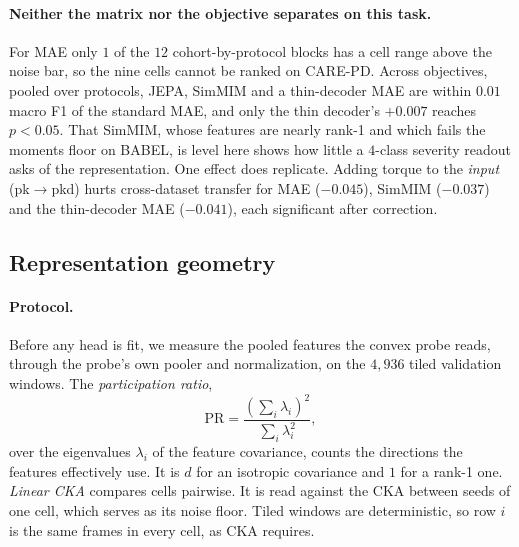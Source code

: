 \paragraph{Neither the matrix nor the objective separates on this task.} For MAE only $1$
of the $12$ cohort-by-protocol blocks has a cell range above the noise bar, so the nine
cells cannot be ranked on CARE-PD. Across objectives, pooled over protocols, JEPA, SimMIM
and a thin-decoder MAE are within $0.01$ macro F1 of the standard MAE, and only the thin
decoder's $+0.007$ reaches $p<0.05$. That SimMIM, whose features are nearly rank-1 and which
fails the moments floor on BABEL, is level here shows how little a $4$-class severity
readout asks of the representation. One effect does replicate. Adding torque to the
\emph{input} (\textsf{pk}$\to$\textsf{pkd}) hurts cross-dataset transfer for MAE
($-0.045$), SimMIM ($-0.037$) and the thin-decoder MAE ($-0.041$), each significant after
correction.

\subsection{Representation geometry}
\label{sec:exp-geometry}

\paragraph{Protocol.} Before any head is fit, we measure the pooled features the convex
probe reads, through the probe's own pooler and normalization, on the $4{,}936$ tiled
validation windows. The \emph{participation ratio},
\begin{equation}
\text{PR} = \frac{\left(\sum_i \lambda_i\right)^2}{\sum_i \lambda_i^2},
\label{eq:pr}
\end{equation}
over the eigenvalues $\lambda_i$ of the feature covariance, counts the directions the
features effectively use. It is $d$ for an isotropic covariance and $1$ for a rank-1 one.
\emph{Linear CKA} compares cells pairwise. It is read against the CKA between seeds of one
cell, which serves as its noise floor. Tiled windows are deterministic, so row $i$ is the
same frames in every cell, as CKA requires.

